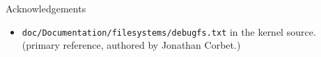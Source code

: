 \documentclass{beamer}
\begin{document}
\begin{frame}{Acknowledgements}

  \begin{itemize}

  \item \texttt{doc/Documentation/filesystems/debugfs.txt} in the
    kernel source. (primary reference, authored by Jonathan Corbet.)

  \end{itemize}

\end{frame}
\end{document}
